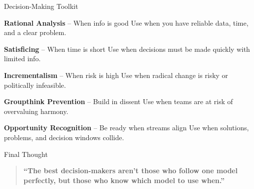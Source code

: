 \documentclass[10pt]{beamer}
\begin{document}
\begin{frame}{Decision-Making Toolkit}
\begin{block}{\textbf{Rational Analysis} -- When info is good}
Use when you have reliable data, time, and a clear problem. 
\end{block}

\begin{block}{\textbf{Satisficing} -- When time is short}
Use when decisions must be made quickly with limited info. 
\end{block}

\begin{block}{\textbf{Incrementalism} -- When risk is high}
Use when radical change is risky or politically infeasible. 
\end{block}

\begin{block}{\textbf{Groupthink Prevention} -- Build in dissent}
Use when teams are at risk of overvaluing harmony. 
\end{block}

\begin{block}{\textbf{Opportunity Recognition} -- Be ready when streams align}
Use when solutions, problems, and decision windows collide. 
\end{block}
\end{frame}

\begin{frame}{Final Thought}
\begin{quote}
\textbf{``The best decision-makers aren't those who follow one model perfectly, but those who know which model to use when.''}
\end{quote}
\end{frame}
\end{document}
